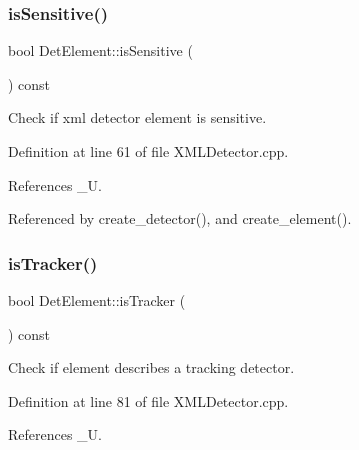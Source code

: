 \subsubsection{\texorpdfstring{is\+Sensitive()}{isSensitive()}}
{\footnotesize\ttfamily bool Det\+Element\+::is\+Sensitive (\begin{DoxyParamCaption}{ }\end{DoxyParamCaption}) const}



Check if xml detector element is sensitive. 



Definition at line 61 of file X\+M\+L\+Detector.\+cpp.



References \+\_\+U.



Referenced by create\+\_\+detector(), and create\+\_\+element().

\hypertarget{struct_d_d4hep_1_1_x_m_l_1_1_det_element_a92fb0357e40a95fdaef1e406d7dc0fba}{}\label{struct_d_d4hep_1_1_x_m_l_1_1_det_element_a92fb0357e40a95fdaef1e406d7dc0fba} 
\subsubsection{\texorpdfstring{is\+Tracker()}{isTracker()}}
{\footnotesize\ttfamily bool Det\+Element\+::is\+Tracker (\begin{DoxyParamCaption}{ }\end{DoxyParamCaption}) const}



Check if element describes a tracking detector. 



Definition at line 81 of file X\+M\+L\+Detector.\+cpp.



References \+\_\+U.

\hypertarget{struct_d_d4hep_1_1_x_m_l_1_1_det_element_a87ab96f2e6f27d7c8242fb3b8c0b2dac}{}\label{struct_d_d4hep_1_1_x_m_l_1_1_det_element_a87ab96f2e6f27d7c8242fb3b8c0b2dac} 

